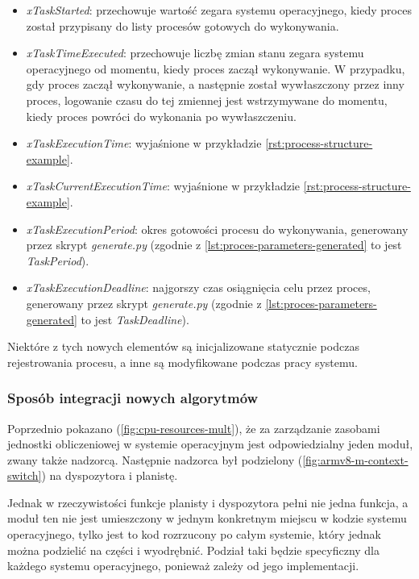 \documentclass[../../main]{subfiles}
\begin{document}
\begin{itemize}
    \item \textit{xTaskStarted}: przechowuje wartość zegara systemu operacyjnego, kiedy proces został przypisany do listy procesów gotowych do wykonywania.
    \item \textit{xTaskTimeExecuted}: przechowuje liczbę zmian stanu zegara systemu operacyjnego od momentu, kiedy proces zaczął wykonywanie. W przypadku, gdy proces zaczął wykonywanie, a następnie został wywłaszczony przez inny proces, logowanie czasu do tej zmiennej jest wstrzymywane do momentu, kiedy proces powróci do wykonania po wywłaszczeniu.
    \item \textit{xTaskExecutionTime}: wyjaśnione w przykładzie \ref{rst:process-structure-example}.
    \item \textit{xTaskCurrentExecutionTime}: wyjaśnione w przykładzie \ref{rst:process-structure-example}.
    \item \textit{xTaskExecutionPeriod}: okres gotowości procesu do wykonywania, generowany przez skrypt \textit{generate.py} (zgodnie z \ref{lst:proces-parameters-generated} to jest \textit{TaskPeriod}).
    \item \textit{xTaskExecutionDeadline}: najgorszy czas osiągnięcia celu przez proces, generowany przez skrypt \textit{generate.py} (zgodnie z \ref{lst:proces-parameters-generated} to jest \textit{TaskDeadline}).
\end{itemize}

Niektóre z tych nowych elementów są inicjalizowane statycznie podczas rejestrowania procesu, a inne są modyfikowane podczas pracy systemu.

\subsubsection{Sposób integracji nowych algorytmów}

Poprzednio pokazano (\cref{fig:cpu-resources-mult}), że za zarządzanie zasobami jednostki obliczeniowej w systemie operacyjnym jest odpowiedzialny jeden moduł, zwany także nadzorcą. Następnie nadzorca był podzielony (\cref{fig:armv8-m-context-switch}) na dyspozytora i planistę.

Jednak w rzeczywistości funkcje planisty i dyspozytora pełni nie jedna funkcja, a moduł ten nie jest umieszczony w jednym konkretnym miejscu w kodzie systemu operacyjnego, tylko jest to kod rozrzucony po całym systemie, który jednak można podzielić na części i wyodrębnić. Podział taki będzie specyficzny dla każdego systemu operacyjnego, ponieważ zależy od jego implementacji.
\end{document}
